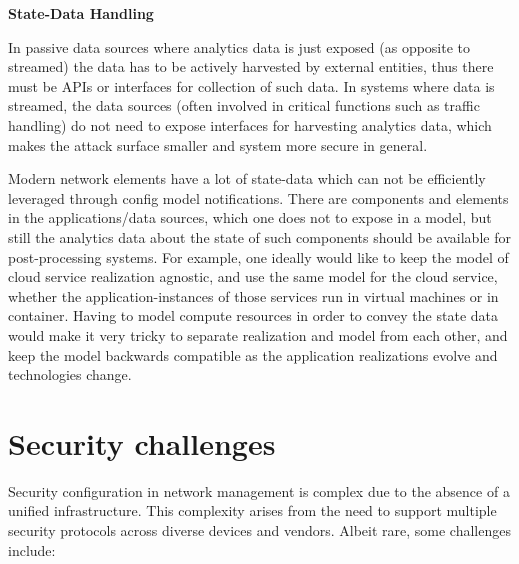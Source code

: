 \documentclass[10pt,sigconf]{iabart}
\begin{document}
\textbf{State-Data Handling}

In passive data sources where analytics data is just exposed (as opposite to streamed) the data has to be actively harvested by external entities, thus there must be APIs or interfaces for collection of such data. In systems where data is streamed, the data sources (often involved in critical functions such as traffic handling) do not need to expose interfaces for harvesting analytics data, which makes the attack surface smaller and system more secure in general.

Modern network elements have a lot of state-data which can not be efficiently leveraged through config model notifications. There are components and elements in the applications/data sources, which one does not to expose in a model, but still the analytics data about the state of such components should be available for post-processing systems. For example, one ideally would like to keep the model of cloud service realization agnostic, and use the same model for the cloud service, whether the application-instances of those services run in virtual machines or in container. Having to model compute resources in order to convey the state data would make it very tricky to separate realization and model from each other, and keep the model backwards compatible as the application realizations evolve and technologies change.






\section{Security challenges} \label{security}

Security configuration in network management is complex due to the absence of a unified infrastructure. This complexity arises from the need to support multiple security protocols across diverse devices and vendors. Albeit rare, some challenges include:
\end{document}
